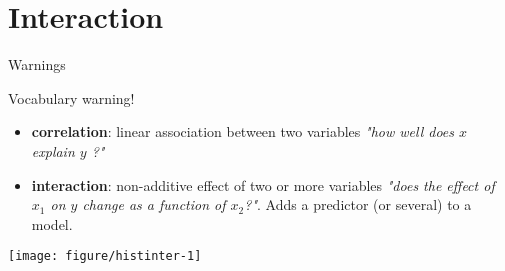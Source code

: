 \documentclass[10pt]{beamer}\usepackage[]{graphicx}\usepackage[]{color}
\newenvironment{knitrout}{}{} %
\begin{document}
\section{Interaction}

\begin{frame}[fragile]{Warnings}

  \begin{alertblock}{Vocabulary warning!}
    \begin{itemize}[<+->]
      \item \textbf{correlation}: linear association between two variables \textit{"how well does $x$ explain $y$ ?"}
      \item \textbf{interaction}: non-additive effect of two or more variables \textit{"does the effect of $x_1$ on $y$ change as a function of $x_2$?"}. Adds a predictor (or several) to a model.
    \end{itemize}
  \end{alertblock}

\pause
\begin{knitrout}\small
{}\color{fgcolor}
\texttt{[image: figure/histinter-1]} 

\end{knitrout}
\end{frame}
\end{document}
